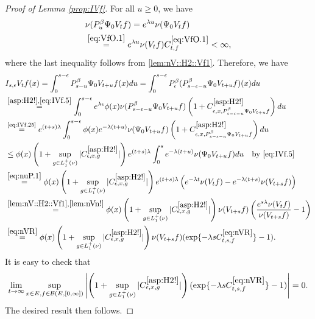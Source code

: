 \documentclass[12pt,a4paper]{amsart}
\numberwithin{equation}{section}
\theoremstyle{plain}
\theoremstyle{definition}
\theoremstyle{remark}
\begin{document}
\begin{proof}[Proof of Lemma \ref{prop:IVf}]
	For all $u\geq 0$, we have
\begin{align} \label{eq:IVf.25}
	&\nu(P_u^\beta \Psi_0 V_t f) = e^{\lambda u}\nu(\Psi_0 V_t f)
	\\&\overset{\eqref{eq:VfO.1}}=e^{\lambda u}\nu(V_tf) C^{\eqref{eq:VfO.1}}_{t,f}
	< \infty, \label{eq:IVf.5}
\end{align}
	where the last inequality follows from \eqref{lem:nV::H2::Vf1}.
	Therefore, we have
\begin{align}
 	& I_{s,\epsilon} V_t f(x)
 	= \int_0^{s- \epsilon} P_{s-u}^\beta \Psi_0 V_{t+u} f (x) du
 	= \int_0^{s- \epsilon} P_\epsilon^\beta (P_{s - \epsilon - u}^\beta \Psi_0 V_{t+u} f )(x) du
 	\\&\overset{\eqref{asp:H2!},\eqref{eq:IVf.5}}= \int_0^{s - \epsilon} e^{\lambda \epsilon} \phi(x) \nu(P_{s - \epsilon - u}^{\beta} \Psi_0 V_{t+u} f)  \left(1+C^{\eqref{asp:H2!}}_{\epsilon ,x , P_{s - \epsilon - u}^{\beta} \Psi_0 V_{t+u} f}\right) du
	\\&\overset{\text{\eqref{eq:IVf.25}}}= e^{(t+s)\lambda} \int_0^{s - \epsilon} \phi(x) e^{-\lambda (t+u)}\nu(\Psi_0 V_{t+u} f)  \left(1+C^{\eqref{asp:H2!}}_{\epsilon ,x , P_{s - \epsilon - u}^{\beta} \Psi_0 V_{t+u} f}\right) du
	\\&\leq \phi(x) \left(1+\sup_{g\in L_1^+(\nu)}|C^{\eqref{asp:H2!}}_{\epsilon ,x , g}|\right) e^{(t+s)\lambda} \int_0^{s} e^{-\lambda (t+u)} \nu(\Psi_0 V_{t+u}f)du\quad\text{by \eqref{eq:IVf.5}}
 	\\&\overset{\eqref{eq:nuP.1}}= \phi(x) \left(1+\sup_{g\in L_1^+(\nu)}|C^{\eqref{asp:H2!}}_{\epsilon ,x , g}|\right)  e^{(t+s)\lambda} \left(e^{-\lambda t}\nu(V_tf)- e^{-\lambda(t+s)}\nu(V_{t+s}f)\right)
 	\\&\overset{\eqref{lem:nV::H2::Vf1},\eqref{lem:nVn!}}= \phi(x) \left(1+\sup_{g\in L_1^+(\nu)}|C^{\eqref{asp:H2!}}_{\epsilon ,x , g}|\right) \nu(V_{t+s}f) \left( \frac{e^{s \lambda }\nu(V_tf)}{\nu(V_{t+s}f)} - 1\right)
 	\\&\overset{\eqref{eq:nVR}}= \phi(x) \left(1+\sup_{g\in L_1^+(\nu)}|C^{\eqref{asp:H2!}}_{\epsilon ,x , g}|\right) \nu(V_{t+s}f) ( \exp\{- \lambda s C^{\eqref{eq:nVR}}_{t,s,f}\} - 1).
\end{align}
	It is easy to check that
\begin{equation}
	\lim_{t\to \infty}\sup_{x\in E, f\in \mathcal B(E,[0,\infty])}
	\left|\left(1+\sup_{g\in L_1^+(\nu)}|C^{\eqref{asp:H2!}}_{\epsilon ,x , g}|\right)( \exp\{- \lambda s C^{\eqref{eq:nVR}}_{t,s,f}\} - 1) \right| = 0.
\end{equation}
	The desired result then follows.
\end{proof}
\end{document}
